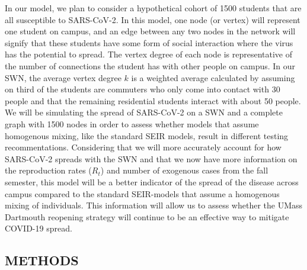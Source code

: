 \documentclass[fullpage]{extarticle}
\begin{document}
\begin{large}
\begin{flushleft}
In our model, we plan to consider a hypothetical cohort of 1500 students that are all susceptible to SARS-CoV-2. In this model, one node (or vertex) will represent one student on campus, and an edge between any two nodes in the network will signify that these students have some form of social interaction where the virus has the potential to spread. The vertex degree of each node is representative of the number of connections the student has with other people on campus. In our SWN, the average vertex degree $k$ is a weighted average calculated by assuming on third of the students are commuters who only come into contact with 30 people and that the remaining residential students interact with about 50 people. We will be simulating the spread of SARS-CoV-2 on a SWN and a complete graph with 1500 nodes in order to assess whether models that assume homogenous mixing, like the standard SEIR models, result in different testing recommentations. Considering that we will more accurately account for how SARS-CoV-2 spreads with the SWN and that we now have more information on the reproduction rates ($R_t$) and number of exogenous cases from the fall semester, this model will be a better indicator of the spread of the disease across campus compared to the standard SEIR-models that assume a homogenous mixing of individuals. This information will allow us to assess whether the UMass Dartmouth reopening strategy will continue to be an effective way to mitigate COVID-19 spread.\bigbreak\bigbreak
\end{flushleft}
\end{large}

\begin{center}
\section{METHODS}
\label{sec:2}
\end{center}
\end{document}
